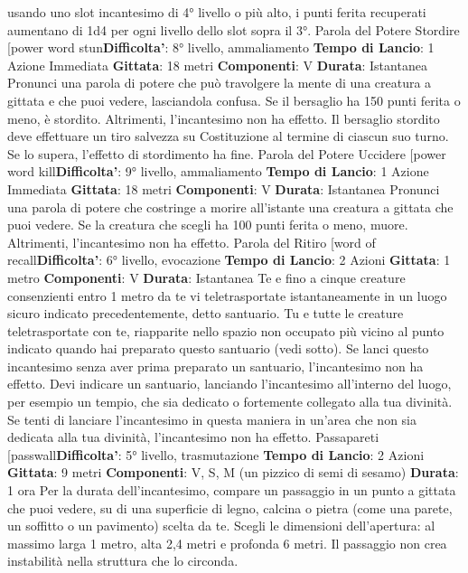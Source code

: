 \begin{multicols}{2}
usando uno slot incantesimo di 4° livello o più alto, i
punti ferita recuperati aumentano di 1d4 per ogni livello
dello slot sopra il 3°.
Parola del Potere Stordire
[power word stun\textbf{Difficolta'}:
8° livello, ammaliamento
\textbf{Tempo di Lancio}: 1 Azione Immediata
\textbf{Gittata}: 18 metri
\textbf{Componenti}: V
\textbf{Durata}: Istantanea
Pronunci una parola di potere che può travolgere la
mente di una creatura a gittata e che puoi vedere,
lasciandola confusa. Se il bersaglio ha 150 punti ferita o
meno, è stordito. Altrimenti, l’incantesimo non ha
effetto.
Il bersaglio stordito deve effettuare un tiro salvezza su
Costituzione al termine di ciascun suo turno. Se lo
supera, l’effetto di stordimento ha fine.
Parola del Potere Uccidere
[power word kill\textbf{Difficolta'}:
9° livello, ammaliamento
\textbf{Tempo di Lancio}: 1 Azione Immediata
\textbf{Gittata}: 18 metri
\textbf{Componenti}: V
\textbf{Durata}: Istantanea
Pronunci una parola di potere che costringe a morire
all’istante una creatura a gittata che puoi vedere. Se la
creatura che scegli ha 100 punti ferita o meno, muore.
Altrimenti, l’incantesimo non ha effetto.
Parola del Ritiro
[word of recall\textbf{Difficolta'}:
6° livello, evocazione
\textbf{Tempo di Lancio}: 2 Azioni
\textbf{Gittata}: 1 metro
\textbf{Componenti}: V
\textbf{Durata}: Istantanea
Te e fino a cinque creature consenzienti entro 1 metro
da te vi teletrasportate istantaneamente in un luogo
sicuro indicato precedentemente, detto santuario. Tu e
tutte le creature teletrasportate con te, riapparite nello
spazio non occupato più vicino al punto indicato quando
hai preparato questo santuario (vedi sotto). Se lanci
questo incantesimo senza aver prima preparato un
santuario, l’incantesimo non ha effetto.
Devi indicare un santuario, lanciando l’incantesimo
all’interno del luogo, per esempio un tempio, che sia
dedicato o fortemente collegato alla tua divinità. Se tenti
di lanciare l’incantesimo in questa maniera in un’area
che non sia dedicata alla tua divinità, l’incantesimo non
ha effetto.
Passapareti
[passwall\textbf{Difficolta'}:
5° livello, trasmutazione
\textbf{Tempo di Lancio}: 2 Azioni
\textbf{Gittata}: 9 metri
\textbf{Componenti}: V, S, M (un pizzico di semi di sesamo)
\textbf{Durata}: 1 ora
Per la durata dell’incantesimo, compare un passaggio
in un punto a gittata che puoi vedere, su di una
superficie di legno, calcina o pietra (come una parete,
un soffitto o un pavimento) scelta da te. Scegli le
dimensioni dell’apertura: al massimo larga 1 metro, 
alta 2,4 metri e profonda 6 metri. Il passaggio non crea
instabilità nella struttura che lo circonda.

\end{multicols}
